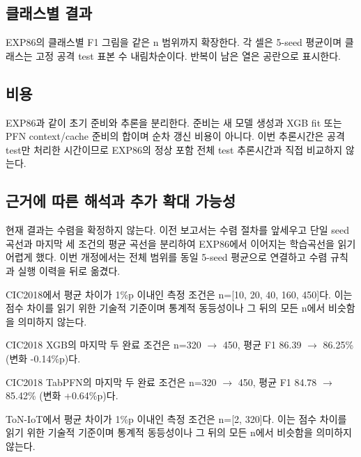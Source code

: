 \subsection{클래스별 결과}
EXP86의 클래스별 F1 그림을 같은 n 범위까지 확장한다. 각 셀은 5-seed 평균이며 클래스는 고정 공격 test 표본 수 내림차순이다. 반복이 남은 열은 공란으로 표시한다.





\subsection{비용}
EXP86과 같이 초기 준비와 추론을 분리한다. 준비는 새 모델 생성과 XGB fit 또는 PFN context/\allowbreak{}cache 준비의 합이며 순차 갱신 비용이 아니다. 이번 추론시간은 공격 test만 처리한 시간이므로 EXP86의 정상 포함 전체 test 추론시간과 직접 비교하지 않는다.



\subsection{근거에 따른 해석과 추가 확대 가능성}
현재 결과는 수렴을 확정하지 않는다. 이전 보고서는 수렴 절차를 앞세우고 단일 seed 곡선과 마지막 세 조건의 평균 곡선을 분리하여 EXP86에서 이어지는 학습곡선을 읽기 어렵게 했다. 이번 개정에서는 전체 범위를 동일 5-seed 평균으로 연결하고 수렴 규칙과 실행 이력을 뒤로 옮겼다.

CIC2018에서 평균 차이가 1\%p 이내인 측정 조건은 n=\allowbreak{}[10, 20, 40, 160, 450]다. 이는 점수 차이를 읽기 위한 기술적 기준이며 통계적 동등성이나 그 뒤의 모든 n에서 비슷함을 의미하지 않는다.

CIC2018 XGB의 마지막 두 완료 조건은 n=\allowbreak{}320 \ensuremath{\rightarrow} 450, 평균 F1 86.39 \ensuremath{\rightarrow} 86.25\% (변화 -0.14\%p)다.

CIC2018 TabPFN의 마지막 두 완료 조건은 n=\allowbreak{}320 \ensuremath{\rightarrow} 450, 평균 F1 84.78 \ensuremath{\rightarrow} 85.42\% (변화 +\allowbreak{}0.64\%p)다.

ToN-IoT에서 평균 차이가 1\%p 이내인 측정 조건은 n=\allowbreak{}[2, 320]다. 이는 점수 차이를 읽기 위한 기술적 기준이며 통계적 동등성이나 그 뒤의 모든 n에서 비슷함을 의미하지 않는다.

